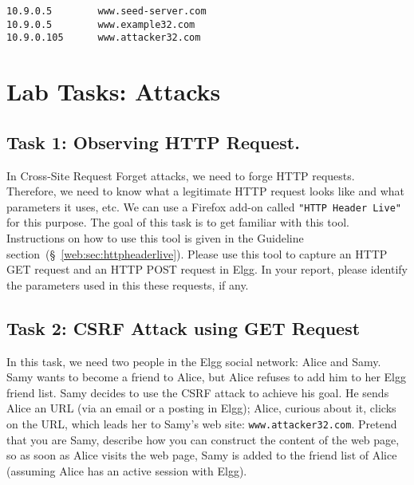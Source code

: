 \begin{lstlisting}
10.9.0.5        www.seed-server.com
10.9.0.5        www.example32.com
10.9.0.105      www.attacker32.com
\end{lstlisting}


\vspace{-0.1in}



\vspace{-0.1in}



\section{Lab Tasks: Attacks}


\subsection{Task 1: Observing HTTP Request.}

In Cross-Site Request Forget attacks, we need to forge HTTP requests. 
Therefore, we need to know what a legitimate HTTP request looks like and 
what parameters it uses, etc. 
We can use a Firefox add-on called \texttt{"HTTP Header Live"} for this
purpose.  
The goal of this task is to get familiar with this tool. 
Instructions on how to use this tool is given in the Guideline
section~(\S~\ref{web:sec:httpheaderlive}).
Please use this tool to capture an HTTP GET request and an HTTP POST
request in Elgg. In your report, please identify the parameters
used in this these requests, if any. 



\subsection{Task 2: CSRF Attack using GET Request}

In this task, we need two people in the Elgg social network: Alice
and Samy. Samy wants to become a friend to Alice, but Alice refuses to add 
him to her Elgg friend list. Samy decides to use the CSRF attack to
achieve his goal. He sends Alice an URL (via an email or a posting in 
Elgg); Alice, curious about it, clicks on the URL, which leads her to Samy's web site:    
\texttt{www.attacker32.com}. Pretend that you are Samy, describe how you
can construct the content of the web page, so as soon as Alice visits the
web page, Samy is added to the friend list of Alice (assuming Alice has an
active session with Elgg).


